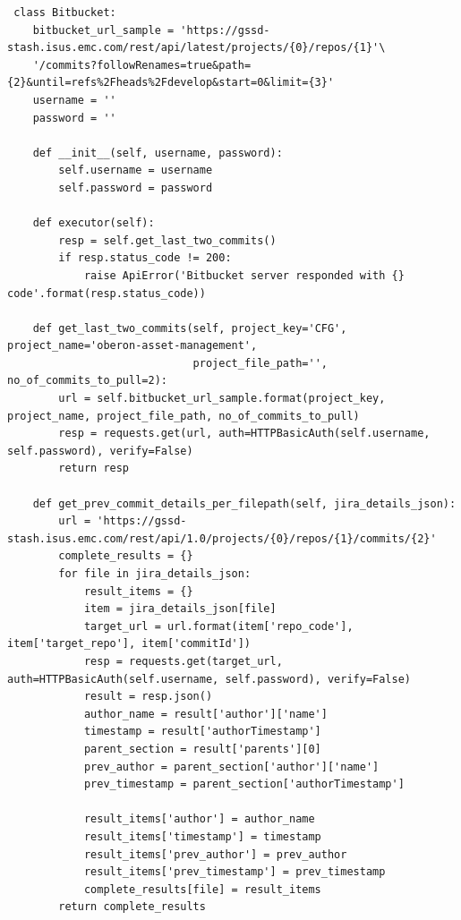\begin{landscape}
\begin{code}
 \label{code:bitbucket.py}
 \begin{verbatim}
 class Bitbucket:
    bitbucket_url_sample = 'https://gssd-stash.isus.emc.com/rest/api/latest/projects/{0}/repos/{1}'\
    '/commits?followRenames=true&path={2}&until=refs%2Fheads%2Fdevelop&start=0&limit={3}'
    username = ''
    password = ''

    def __init__(self, username, password):
        self.username = username
        self.password = password

    def executor(self):
        resp = self.get_last_two_commits()
        if resp.status_code != 200:
            raise ApiError('Bitbucket server responded with {} code'.format(resp.status_code))

    def get_last_two_commits(self, project_key='CFG', project_name='oberon-asset-management',
                             project_file_path='', no_of_commits_to_pull=2):
        url = self.bitbucket_url_sample.format(project_key, project_name, project_file_path, no_of_commits_to_pull)
        resp = requests.get(url, auth=HTTPBasicAuth(self.username, self.password), verify=False)
        return resp

    def get_prev_commit_details_per_filepath(self, jira_details_json):
        url = 'https://gssd-stash.isus.emc.com/rest/api/1.0/projects/{0}/repos/{1}/commits/{2}'
        complete_results = {}
        for file in jira_details_json:
            result_items = {}
            item = jira_details_json[file]
            target_url = url.format(item['repo_code'], item['target_repo'], item['commitId'])
            resp = requests.get(target_url, auth=HTTPBasicAuth(self.username, self.password), verify=False)
            result = resp.json()
            author_name = result['author']['name']
            timestamp = result['authorTimestamp']
            parent_section = result['parents'][0]
            prev_author = parent_section['author']['name']
            prev_timestamp = parent_section['authorTimestamp']

            result_items['author'] = author_name
            result_items['timestamp'] = timestamp
            result_items['prev_author'] = prev_author
            result_items['prev_timestamp'] = prev_timestamp
            complete_results[file] = result_items
        return complete_results

 \end{verbatim}
 \end{code}
 

\end{landscape}
